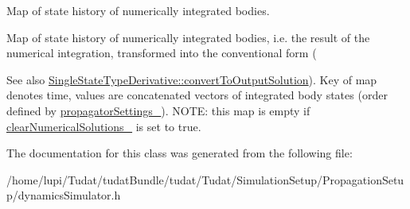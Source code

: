 Map of state history of numerically integrated bodies. 

Map of state history of numerically integrated bodies, i.\+e. the result of the numerical integration, transformed into the \textquotesingle{}conventional form\textquotesingle{} (\begin{DoxySeeAlso}{See also}
\hyperlink{classtudat_1_1propagators_1_1SingleStateTypeDerivative_aeab2b2a9eae937200a5def64dcf18960}{Single\+State\+Type\+Derivative\+::convert\+To\+Output\+Solution}). Key of map denotes time, values are concatenated vectors of integrated body states (order defined by \hyperlink{classtudat_1_1propagators_1_1DynamicsSimulator_a99c9142e767acc697f85abc88a5e81c6}{propagator\+Settings\+\_\+}). N\+O\+TE\+: this map is empty if \hyperlink{classtudat_1_1propagators_1_1DynamicsSimulator_ad847a666b8dd2357df29a84f149665af}{clear\+Numerical\+Solutions\+\_\+} is set to true. 
\end{DoxySeeAlso}


The documentation for this class was generated from the following file\+:\begin{DoxyCompactItemize}
\item 
/home/lupi/\+Tudat/tudat\+Bundle/tudat/\+Tudat/\+Simulation\+Setup/\+Propagation\+Setup/dynamics\+Simulator.\+h\end{DoxyCompactItemize}

